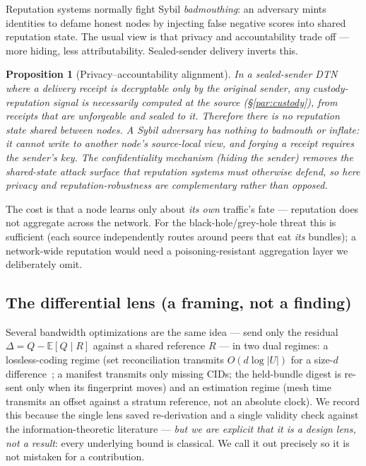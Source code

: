 \documentclass[11pt]{article}
\newtheorem{proposition}{Proposition}
\begin{document}
Reputation systems normally fight Sybil \emph{badmouthing}: an adversary mints
identities to defame honest nodes by injecting false negative scores into shared
reputation state. The usual view is that privacy and accountability trade off ---
more hiding, less attributability. Sealed-sender delivery inverts this.

\begin{proposition}[Privacy--accountability alignment]\label{prop:privacy}
In a sealed-sender DTN where a delivery receipt is decryptable only by the
original sender, any custody-reputation signal is necessarily computed at the
source (\S\ref{par:custody}), from receipts that are unforgeable and sealed to it.
Therefore there is no reputation state shared between nodes. A Sybil adversary has
nothing to badmouth or inflate: it cannot write to another node's source-local
view, and forging a receipt requires the sender's key. The confidentiality
mechanism (hiding the sender) removes the shared-state attack surface that
reputation systems must otherwise defend, so here privacy and reputation-robustness
are complementary rather than opposed.
\end{proposition}

The cost is that a node learns only about \emph{its own} traffic's fate ---
reputation does not aggregate across the network. For the black-hole/grey-hole
threat this is sufficient (each source independently routes around peers that eat
\emph{its} bundles); a network-wide reputation would need a poisoning-resistant
aggregation layer we deliberately omit.

\subsection{The differential lens (a framing, not a finding)}\label{sub:diff}

Several bandwidth optimizations are the same idea --- send only the residual
$\Delta = Q - \mathbb{E}[Q\mid R]$ against a shared reference $R$ --- in two dual
regimes: a lossless-coding regime (set reconciliation transmits $O(d\log|U|)$ for
a size-$d$ difference~\cite{minsky2003setrec}; a manifest transmits only missing
CIDs; the held-bundle digest is re-sent only when its fingerprint moves) and an
estimation regime (mesh time transmits an offset against a stratum reference, not
an absolute clock). We record this because the single lens saved re-derivation and
a single validity check against the information-theoretic literature ---
\emph{but we are explicit that it is a design lens, not a result}: every
underlying bound is classical. We call it out precisely so it is not mistaken for
a contribution.
\end{document}
